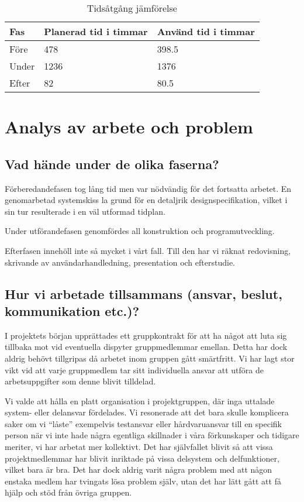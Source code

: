 \documentclass[a4paper,12pt]{article}
\begin{document}
\begin{table}[H]
\centering
\begin{tabularx}{0.5\textwidth}{|X|X|X|}
\hline
Fas & Planerad tid i timmar & Använd tid i timmar \\ \hline
Före & 478 & 398.5 \\ \hline
Under & 1236 & 1376 \\ \hline
Efter & 82 & 80.5 \\ \hline
\end{tabularx}
\caption{Tidsåtgång jämförelse}
\end{table}

\section{Analys av arbete och problem}

\subsection{Vad hände under de olika faserna?}
Förberedandefasen tog lång tid men var nödvändig för det fortsatta arbetet. En genomarbetad systemskiss la grund för en detaljrik designspecifikation, vilket i sin tur resulterade i en väl utformad tidplan.

Under utförandefasen genomfördes all konstruktion och programutveckling. 

Efterfasen innehöll inte så mycket i vårt fall. Till den har vi räknat redovisning, skrivande av användarhandledning, presentation och efterstudie.

\subsection{Hur vi arbetade tillsammans (ansvar, beslut, kommunikation etc.)?}
I projektets början upprättades ett gruppkontrakt för att ha något att luta sig tillbaka mot vid eventuella dispyter gruppmedlemmar emellan. Detta har dock aldrig behövt tillgripas då arbetet inom gruppen gått smärtfritt. Vi har lagt stor vikt vid att varje gruppmedlem tar sitt individuella ansvar att utföra de arbetsuppgifter som denne blivit tilldelad.

Vi valde att hålla en platt organisation i projektgruppen, där inga uttalade system- eller delansvar fördelades. Vi resonerade att det bara skulle komplicera saker om vi “låste” exempelvis testansvar eller hårdvaruansvar till en specifik person när vi inte hade några egentliga skillnader i våra förkunskaper och tidigare meriter, vi har arbetat mer kollektivt. Det har självfallet blivit så att vissa projektmedlemmar har blivit inriktade på vissa delsystem och delfunktioner, vilket bara är bra. Det har dock aldrig varit några problem med att någon enstaka medlem har tvingats lösa problem själv, utan det har lätt gått att få hjälp och stöd från övriga gruppen.
\end{document}
